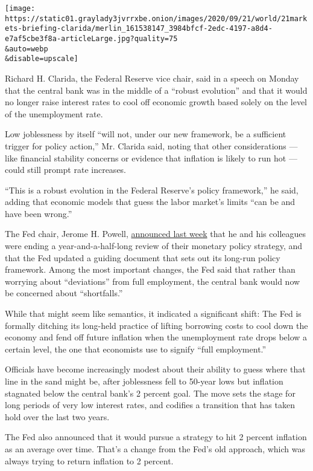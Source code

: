 \texttt{[image: https://static01.graylady3jvrrxbe.onion/images/2020/09/21/world/21markets-briefing-clarida/merlin\_161538147\_3984bfcf-2edc-4197-a8d4-e7af5cbe3f8a-articleLarge.jpg?quality=75\\\&auto=webp\\\&disable=upscale]}

Richard H. Clarida, the Federal Reserve vice chair, said in a speech on
Monday that the central bank was in the middle of a ``robust evolution''
and that it would no longer raise interest rates to cool off economic
growth based solely on the level of the unemployment rate.

Low joblessness by itself ``will not, under our new framework, be a
sufficient trigger for policy action,'' Mr. Clarida said, noting that
other considerations --- like financial stability concerns or evidence
that inflation is likely to run hot --- could still prompt rate
increases.

``This is a robust evolution in the Federal Reserve's policy
framework,'' he said, adding that economic models that guess the labor
market's limits ``can be and have been wrong.''

The Fed chair, Jerome H. Powell,
\href{https://www.nytimes3xbfgragh.onion/2020/08/27/business/economy/federal-reserve-inflation-jerome-powell.html}{announced
last week} that he and his colleagues were ending a year-and-a-half-long
review of their monetary policy strategy, and that the Fed updated a
guiding document that sets out its long-run policy framework. Among the
most important changes, the Fed said that rather than worrying about
``deviations'' from full employment, the central bank would now be
concerned about ``shortfalls.''

While that might seem like semantics, it indicated a significant shift:
The Fed is formally ditching its long-held practice of lifting borrowing
costs to cool down the economy and fend off future inflation when the
unemployment rate drops below a certain level, the one that economists
use to signify ``full employment.''

Officials have become increasingly modest about their ability to guess
where that line in the sand might be, after joblessness fell to 50-year
lows but inflation stagnated below the central bank's 2 percent goal.
The move sets the stage for long periods of very low interest rates, and
codifies a transition that has taken hold over the last two years.

The Fed also announced that it would pursue a strategy to hit 2 percent
inflation as an average over time. That's a change from the Fed's old
approach, which was always trying to return inflation to 2 percent.


